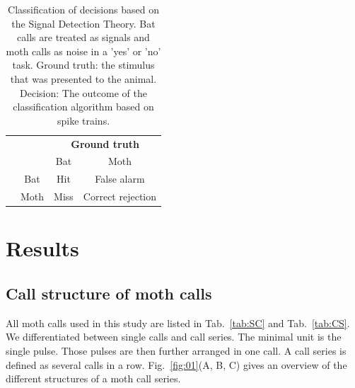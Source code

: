 \documentclass[12pt,a4paper]{article}
\begin{document}
\begin{table}[h]
	\centering
	\caption{Classification of decisions based on the Signal Detection Theory. Bat calls are treated as signals and moth calls as noise in a 'yes' or 'no' task. Ground truth: the stimulus that was presented to the animal. Decision: The outcome of the classification algorithm based on spike trains.}
	\setlength{\tabcolsep}{10pt} %
	\renewcommand{\arraystretch}{1.5} %
	\label{tab:yesno}
	\begin{tabular}{llcc}
		&                                                   & \multicolumn{2}{c}{\cellcolor[HTML]{C0C0C0}\textbf{Ground truth}} \\
		&                                                   & \cellcolor[HTML]{C0C0C0}Bat     & \cellcolor[HTML]{C0C0C0}Moth    \\ \cline{3-4} 
		\multicolumn{1}{c}{\cellcolor[HTML]{C0C0C0}{\color[HTML]{000000} }}                                    & \multicolumn{1}{c|}{\cellcolor[HTML]{C0C0C0}Bat}  & Hit                             & False alarm                     \\
		\multicolumn{1}{c}{\multirow{-2}{*}{\cellcolor[HTML]{C0C0C0}{\color[HTML]{000000} \textbf{Decision}}}} & \multicolumn{1}{c|}{\cellcolor[HTML]{C0C0C0}Moth} & Miss                            & Correct rejection              
	\end{tabular}
\end{table}

\newpage
\section{Results}
\subsection{Call structure of moth calls}
All moth calls used in this study are listed in Tab.~\ref{tab:SC} and Tab.~\ref{tab:CS}. We differentiated between single calls and call series. The minimal unit is the single pulse. Those pulses are then further arranged in one call. A call series is defined as several calls in a row. Fig.~\ref{fig:01}(A, B, C) gives an overview of the different structures of a moth call series.
\end{document}
